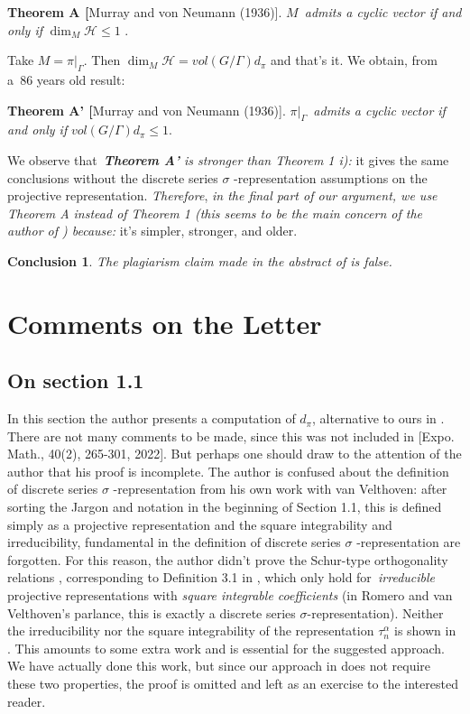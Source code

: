 \documentclass[11pt,reqno]{amsart}
\numberwithin{equation}{section}
\theoremstyle{plain}
\newtheorem*{conclusion}{Conclusion}
\theoremstyle{definition}
\theoremstyle{remark}
\begin{document}
\textbf{Theorem A [}Murray and von Neumann \cite{MurrayvonNeumann} (1936)]. $%
M$\emph{\ admits a cyclic vector if and only if} $\dim _{M}\mathcal{H}\leq 1$%
.

Take $M=\pi |_{\Gamma }$. Then $\dim _{M}\mathcal{H=}vol(G/\Gamma )d_{\pi }$
and that's it. We obtain, from a\emph{\ }86 years old result:

\textbf{Theorem A' [}Murray and von Neumann \cite{MurrayvonNeumann} (1936)]. 
$\pi |_{\Gamma }$\emph{\ admits a cyclic vector if and only if} $%
vol(G/\Gamma )d_{\pi }\leq 1$.

We observe that\emph{\ \textbf{Theorem A' }is stronger than Theorem 1 i): }%
it gives the same conclusions without the discrete series $\sigma $%
-representation  assumptions on the projective representation. \textsl{%
Therefore}, \textsl{in the final part of our argument, we use Theorem A
instead of Theorem 1 (this seems to be the main concern of the author of 
\cite{Letter}) because: }{\large it's simpler, stronger, and older.}

\begin{conclusion}
The plagiarism claim made in the abstract of \cite{Letter} is \textsl{false}.
\end{conclusion}

\section{\textbf{Comments on the Letter}}

\subsection{On section 1.1}

In this section the author presents a computation of $d_{\pi }$, alternative
to ours in \cite{Affine}. There are not many comments to be made, since this
was not included in [Expo. Math., 40(2), 265-301, 2022]. But perhaps one
should draw to the attention of the author that his proof is incomplete. The
author is confused about the definition of discrete series $\sigma $%
-representation from his own work with van Velthoven: after sorting the
Jargon and notation in the beginning of Section 1.1, this is defined simply
as a projective representation and the square integrability and
irreducibility, fundamental in the definition of discrete series $\sigma $%
-representation are forgotten. For this reason, the author didn't prove the
Schur-type orthogonality relations \cite[(1.5)]{Letter}, corresponding to
Definition 3.1 in \cite{Radulescu}, which only hold for\emph{\ irreducible }%
projective representations with \emph{square integrable coefficients }(in
Romero and van Velthoven's parlance, this is exactly a discrete series $%
\sigma $-representation). Neither the irreducibility nor the square
integrability of the representation $\tau _{n}^{\alpha }$ is shown in \cite%
{Letter}. This amounts to some extra work and is essential for the suggested
approach. We have actually done this work, but since our approach in \cite%
{Affine} does not require these two properties, the proof is omitted and
left as an exercise to the interested reader.
\end{document}
